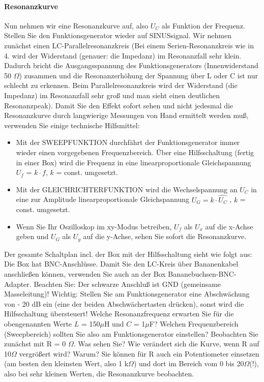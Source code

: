 \documentclass[12pt]{scrartcl}
\begin{document}
\paragraph{Resonanzkurve} 
Nun nehmen wir eine Resonanzkurve auf, also $U_C$ als Funktion der Frequenz. Stellen Sie den Funktionsgenerator wieder auf SINUSsignal. Wir nehmen zunächst einen LC-Parallelresonanzkreis (Bei einem Serien-Resonanzkreis wie in 4. wird der Widerstand (genauer: die Impedanz) im Resonanzfall sehr klein. Dadurch bricht die Ausgangsspannung des Funktionsgenerators (Innenwiderstand 50
$\Omega$) zusammen und die Resonanzerhöhung der Spannung über L oder C ist
nur schlecht zu erkennen. Beim Parallelresonanzkreis wird der Widerstand (die Impedanz) im Resonanzfall sehr groß und man sieht einen deutlichen Resonanzpeak).
Damit Sie den Effekt sofort sehen und nicht jedesmal die Resonanzkurve durch langwierige Messungen von Hand
ermittelt werden muß, verwenden Sie einige technische Hilfsmittel:
\begin{itemize}
\item
Mit der SWEEPFUNKTION durchfährt der Funktionsgenerator immer wieder einen vorgegebenen Frequenzbereich. Über eine Hilfsschaltung (fertig in einer Box) wird die Frequenz in eine linearproportionale
Gleichspannung $U_f$ = $k \cdot f$, $k$ = const. umgesetzt.
\item
Mit der GLEICHRICHTERFUNKTION wird die Wechselspannung an $U_C$ in eine zur Amplitude linearproportionale Gleichspannung $U_G = k \cdot \hat{U_C}$ , $k$ = const. umgesetzt.
\item
Wenn Sie Ihr Oszilloskop im xy-Modus betreiben, $U_f$ als $U_x$
auf die x-Achse geben und $U_G$ als $U_y$ auf die y-Achse, sehen Sie sofort die Resonanzkurve.
\end{itemize}
Der gesamte Schaltplan incl. der Box mit der Hilfsschaltung sieht wie folgt aus:
Die Box hat BNC-Anschlüsse. Damit Sie den LC-Kreis über Bananenkabel anschließen können, verwenden Sie auch an der Box Bananebuchsen-BNC-Adapter. Beachten Sie: Der schwarze Anschluß ist GND (gemeinsame
Masseleitung)! Wichtig: Stellen Sie am Funktionsgenerator eine Abschwächung von - 20 dB ein (eine der beiden Abschwächertasten drücken), sonst wird die Hilfsschaltung übersteuert! Welche Resonanzfrequenz erwarten Sie für die obengenannten Werte
$L$ = 150$\mu$H und $C$ = 1$\mu$F? Welchen Frequenzbereich (Sweepbereich) sollten Sie also am Funktionsgenerator einstellen?
Beobachten Sie zunächst mit R = 0
$\Omega$. Was sehen Sie? Wie verändert sich die Kurve, wenn R auf 10$\Omega$ vergrößert wird? Warum? Sie können für R auch ein Potentiometer einsetzen (am besten den kleinsten Wert, also 1 k$\Omega$) und dort im Bereich vom 0 bis 20$\Omega$(!), also bei sehr kleinen Werten, die Resonanzkurve beobachten.
\end{document}
